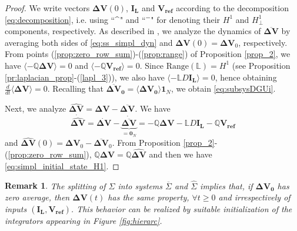 \documentclass[a4paper]{article}
\theoremstyle{plain}
\newtheorem{rmk}{Remark}
\begin{document}
\begin{proof}
	We write vectors $\mathbf{ \Delta V}(0)$, $\mathbf{I_{L}}$ and
	$\mathbf{V_{ref}}$ according to the decomposition
	\eqref{eq:decomposition}, i.e. using
	``\hspace{1mm}$\widehat{\textcolor{white}{v}}$\hspace{1mm}" and
	``\hspace{1mm}$\overline{\textcolor{white}{v}}$\hspace{1mm}" for
	denoting their $H^1$ and $H^1_{\perp}$ components, respectively. As described in \cite{1643380}, we analyze the dynamics of
	$\mathbf{\overline{\Delta V}}$ by averaging both sides of
	\eqref{eq:ss_simpl_dyn} and $\mathbf{\Delta V}(0) = \mathbf{ \Delta
		V}_0$, respectively. From points (\ref{prop:zero_row_sum})-(\ref{prop:range}) of Proposition
	\ref{prop_2}, we have
	$\langle-\mathbb{Q}\mathbf{\Delta V}\rangle = 0$ and $\langle-\mathbb{Q}\mathbf{
		V_{ref}}\rangle=0$. Since $\mathrm{Range}(\mathbb{L}) = H^1$ (see Proposition \ref{pr:laplacian_prop}-(\ref{lapl_3})), we also have $\langle-\mathbb{L} D\mathbf{I_L}\rangle=0$, hence obtaining $\frac{d}{dt}\langle\mathbf{\Delta V}\rangle = 0$. Recalling that $\mathbf{\overline{\Delta V}_0} =\mathbf{\langle{\Delta V_0}\rangle}\mathbf{1}_N$, we obtain \eqref{eq:subsysDGUi}.
	
	Next, we analyze $\mathbf{\widehat{\Delta V}}=\mathbf{\Delta V}-\mathbf{\overline{\Delta V}}$. We have
	\begin{equation*}
	\label{eq:splitting_H1}
	\mathbf{\dot{\widehat{\Delta V}}} = \mathbf{\dot{\Delta V}}-\underbrace{\mathbf{\dot{\overline{{\Delta V}}}}}_{=\mathbf{0}_N} = -{ \mathbb{Q}}\mathbf{{\Delta V}}-{\mathbb{L}}D\mathbf{{I_{L}}}-{\mathbb{Q}}\mathbf{{V_{ref}}}
	\end{equation*}
	and $\mathbf{\widehat{ \Delta V}}(0) =\mathbf{{ \Delta V}}_0 - \mathbf{\overline{ \Delta V}}_0$. From Proposition \ref{prop_2}-(\ref{prop:zero_row_sum}), $\mathbb{Q}\mathbf{{\Delta V}}=\mathbb{Q}\mathbf{\widehat{\Delta V}}$ and then we have \eqref{eq:simpl_initial_state_H1}.  
\end{proof}
\begin{rmk}
	\label{rmk:splitting}
	The splitting of $\Sigma$ into systems $\overline\Sigma$ and
	$\widehat\Sigma$ implies that, if $\mathbf{\Delta V_0}$ has zero
	average, then $\mathbf{\Delta V}(t)$ has the same property,
	$\forall t\geq 0$ and irrespectively of inputs
	$(\mathbf{I_L},\mathbf{V_{ref}})$. This behavior can be realized by
	suitable initialization of the integrators appearing in Figure \ref{fig:hierarc}.
\end{rmk}
\end{document}
